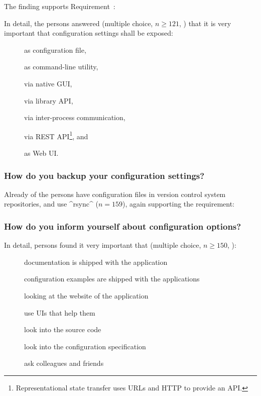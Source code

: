 The finding supports Requirement~:

\reqLegacy*

\methodQuestion{}
In detail, the persons answered (multiple choice, $n\geq121$, ) that it is very important that configuration settings shall be exposed:
\begin{multicols}{2}
\begin{description}
\item[] as configuration file,
\item[] as command-line utility,
\item[] via native GUI,
\item[] via library API,
\item[] via inter-process communication,
\item[] via REST API\footnote{Representational state transfer uses URLs and HTTP to provide an API.}, and
\item[] as Web UI.
\end{description}
\end{multicols}

\subsubsection{How do you backup your configuration settings?}

\methodQuestion{}
Already  of the persons have configuration files in version control system repositories, and  use ^rsync^ ($n=159$), again supporting the requirement:

\reqLegacy*



\subsubsection{How do you inform yourself about configuration options?}


\methodQuestion{}
In detail, persons found it very important that (multiple choice, $n\geq150$, ):

\begin{description}
\item[] documentation is shipped with the application
\item[] configuration examples are shipped with the applications
\item[] 
\item[] looking at the website of the application
\item[] use UIs that help them
\item[] look into the source code
\item[] 
\item[] look into the configuration specification
\item[] ask colleagues and friends
\end{description}

